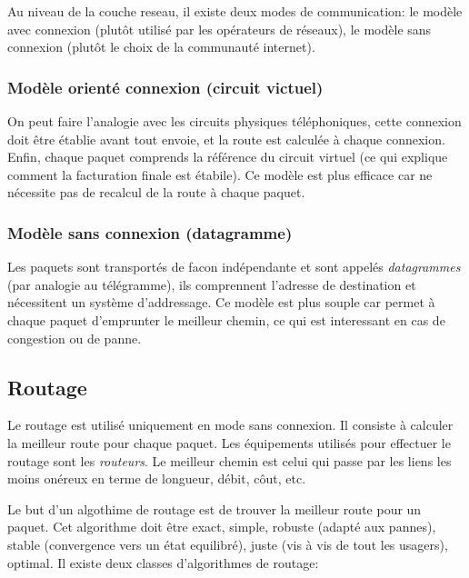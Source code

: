\documentclass[a4paper, 12pt, french]{article}
\begin{document}
	Au niveau de la couche reseau, il existe deux modes de communication: le modèle avec connexion (plutôt utilisé par les opérateurs de réseaux), le modèle sans connexion (plutôt le choix de la communauté internet).

	\subsubsection{Modèle orienté connexion (circuit victuel)}

	On peut faire l'analogie avec les circuits physiques téléphoniques, cette connexion doit être établie avant tout envoie, et la route est calculée à chaque connexion. Enfin, chaque paquet comprends la référence du circuit virtuel (ce qui explique comment la facturation finale est étabile). Ce modèle est plus efficace car ne nécessite pas de recalcul de la route à chaque paquet.

	\subsubsection{Modèle sans connexion (datagramme)}

	Les paquets sont transportés de facon indépendante et sont appelés \emph{datagrammes} (par analogie au télégramme), ils comprennent l'adresse de destination et nécessitent un système d'addressage. Ce modèle est plus souple car permet à chaque paquet d'emprunter le meilleur chemin, ce qui est interessant en cas de congestion ou de panne.

	\subsection{Routage}

	Le routage est utilisé uniquement en mode sans connexion. Il consiste à calculer la meilleur route pour chaque paquet. Les équipements utilisés pour effectuer le routage sont les \emph{routeurs}. Le meilleur chemin est celui qui passe par les liens les moins onéreux en terme de longueur, débit, côut, etc.

	Le but d'un algothime de routage est de trouver la meilleur route pour un paquet. Cet algorithme doit être exact, simple, robuste (adapté aux pannes), stable (convergence vers un état equilibré), juste (vis à vis de tout les usagers), optimal. Il existe deux classes d'algorithmes de routage:
\end{document}
